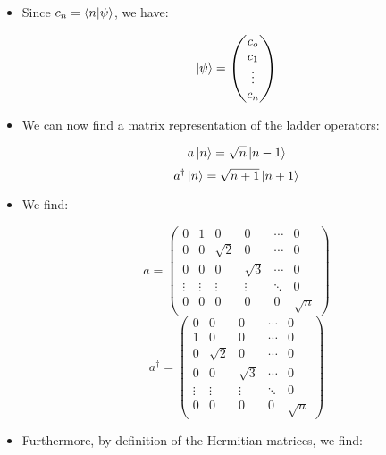 \begin{itemize}
\begin{itemize}
\begin{itemize}
          \item Since $c_n=\bra{n}\ket{\psi}$, we have:

            $$\ket{\psi}=\left( \begin{matrix} c_o\\c_1\\\vdots\\c_n\end{matrix} \right)$$

          \item We can now find a matrix representation of the ladder operators:

            $$a\ket{n}=\sqrt{n}\ket{n-1}$$
            $$a^{\dagger}\ket{n}=\sqrt{n+1}\ket{n+1}$$

          \item We find:

            $$a=\left( \begin{matrix} 0 & 1 & 0 & 0 & \cdots & 0\\ 0 & 0 & \sqrt{2} & 0 & \cdots & 0\\ 0 & 0 & 0 & \sqrt{3} & \cdots & 0\\ \vdots & \vdots & \vdots & \vdots & \ddots & 0\\ 0 & 0 & 0 & 0 & 0 & \sqrt{n}\end{matrix}\right)$$
            $$a^{\dagger}=\left( \begin{matrix} 0 & 0 & 0 & \cdots & 0\\ 1 & 0 & 0 & \cdots & 0 \\ 0 & \sqrt{2} & 0 & \cdots & 0\\ 0 & 0 & \sqrt{3} & \cdots & 0\\ \vdots & \vdots & \vdots & \ddots & 0\\ 0 & 0 & 0 & 0 & \sqrt{n}\end{matrix}\right)$$

          \item Furthermore, by definition of the Hermitian matrices, we find:


\end{itemize}
\end{itemize}
\end{itemize}

